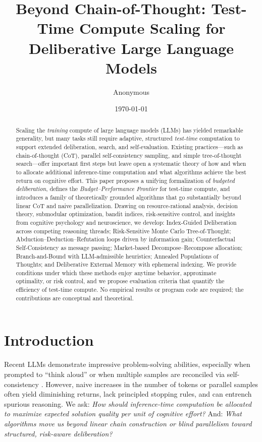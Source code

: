 \documentclass[11pt]{article}
\title{\textbf{Beyond Chain-of-Thought: Test-Time Compute Scaling for Deliberative Large Language Models}}
\author{Anonymous}
\date{\today}
\newcommand{\1}{\mathbb{I}}
\begin{document}
\maketitle

\begin{abstract}
\noindent
Scaling the \emph{training} compute of large language models (LLMs) has yielded remarkable generality, but many tasks still require adaptive, structured \emph{test-time} computation to support extended deliberation, search, and self-evaluation.
Existing practices---such as chain-of-thought (CoT), parallel self-consistency sampling, and simple tree-of-thought search---offer important first steps but leave open a systematic theory of how and when to allocate additional inference-time computation and what algorithms achieve the best return on cognitive effort. 
This paper proposes a unifying formalization of \emph{budgeted deliberation}, defines the \emph{Budget--Performance Frontier} for test-time compute, and introduces a family of theoretically grounded algorithms that go substantially beyond linear CoT and naive parallelization. 
Drawing on resource-rational analysis, decision theory, submodular optimization, bandit indices, risk-sensitive control, and insights from cognitive psychology and neuroscience, we develop: Index-Guided Deliberation across competing reasoning threads; Risk-Sensitive Monte Carlo Tree-of-Thought; Abduction--Deduction--Refutation loops driven by information gain; Counterfactual Self-Consistency as message passing; Market-based Decompose--Recompose allocation; Branch-and-Bound with LLM-admissible heuristics; Annealed Populations of Thoughts; and Deliberative External Memory with ephemeral indexing. 
We provide conditions under which these methods enjoy anytime behavior, approximate optimality, or risk control, and we propose evaluation criteria that quantify the efficiency of test-time compute. No empirical results or program code are required; the contributions are conceptual and theoretical.
\end{abstract}

\vspace{-0.5em}
\section{Introduction}

Recent LLMs demonstrate impressive problem-solving abilities, especially when prompted to ``think aloud'' \cite{wei2022cot} or when multiple samples are reconciled via self-consistency \cite{wang2023selfconsistency}.
However, naive increases in the number of tokens or parallel samples often yield diminishing returns, lack principled stopping rules, and can entrench spurious reasoning.
We ask: \emph{How should inference-time computation be allocated to maximize expected solution quality per unit of cognitive effort?}
And: \emph{What algorithms move us beyond linear chain construction or blind parallelism toward structured, risk-aware deliberation?}
\end{document}
